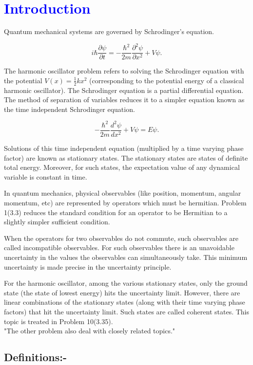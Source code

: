 \chapter{\textcolor{blue}{Introduction}}
Quantum mechanical systems are governed by Schrodinger's equation.

$$i\hbar\frac{\partial{\psi}}{\partial{t}}=-\frac{{\hbar}^2}{2m}\frac{{\partial}^2{\psi}}{\partial{x}^2}+V\psi.$$


The harmonic oscillator problem refers to solving the Schrodinger equation with the potential
$V(x) = \frac 1 2 k x^2$ (corresponding to the potential energy of a classical harmonic oscillator).
The Schrodinger equation is a partial differential equation. The method of separation of variables
reduces it to a simpler equation known as the time independent Schrodinger equation. 

$$-\frac{{\hbar}^2}{2m}\frac{{d}^2{\psi}}{d{x}^2}+V\psi=E\psi.$$

Solutions of this time independent equation (multiplied by a time varying phase factor) are known as stationary states. The stationary states are states of definite total energy. Moreover, for such states, the expectation value of any dynamical variable is constant in time. 

In quantum mechanics, physical observables (like position, momentum, angular momentum, etc)
 are represented by operators which must be hermitian. Problem 1(3.3) reduces the standard
 condition for an operator to be Hermitian to a slightly simpler sufficient condition.

When the operators for two observables do not commute, such observables are called
incompatible observables. For such observables there is an unavoidable uncertainty in the values the observables can simultaneously take. This minimum uncertainty is made precise in the 
uncertainty principle.
 
For the harmonic oscillator, among the various stationary states, only the ground state (the state
of lowest energy) hits the uncertainty limit. However, there are linear combinations of the stationary states (along with their time varying phase factors)  that hit the uncertainty limit.
Such states are called coherent states. This topic is treated in Problem 10(3.35).\\
  "The other problem also deal with closely related topics."
 
\newpage
\section{Definitions:-}
